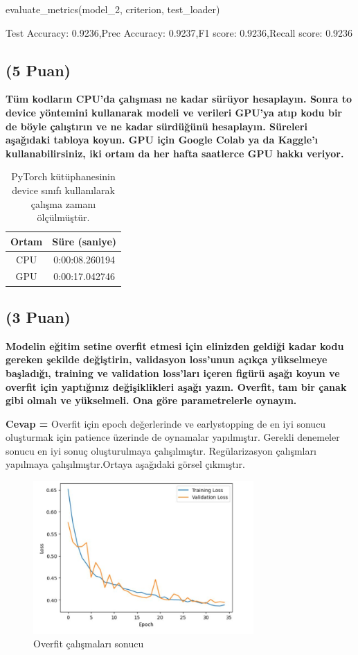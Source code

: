 \documentclass[11pt]{article}
\begin{document}
\begin{python}
evaluate_metrics(model_2, criterion, test_loader)
\end{python}

 Test Accuracy: 0.9236,Prec Accuracy: 0.9237,F1 score: 0.9236,Recall score: 0.9236

\subsection{(5 Puan)} \textbf{Tüm kodların CPU'da çalışması ne kadar sürüyor hesaplayın. Sonra to device yöntemini kullanarak modeli ve verileri GPU'ya atıp kodu bir de böyle çalıştırın ve ne kadar sürdüğünü hesaplayın. Süreleri aşağıdaki tabloya koyun. GPU için Google Colab ya da Kaggle'ı kullanabilirsiniz, iki ortam da her hafta saatlerce GPU hakkı veriyor.}

\begin{table}[ht!]
    \centering
    \caption{PyTorch kütüphanesinin device sınıfı kullanılarak çalışma zamanı ölçülmüştür. }
    \begin{tabular}{c|c}
        Ortam & Süre (saniye) \\\hline
        CPU & 0:00:08.260194  \\
        GPU & 0:00:17.042746\\
    \end{tabular}
    \label{tab:my_table}
\end{table}


\subsection{(3 Puan)} \textbf{Modelin eğitim setine overfit etmesi için elinizden geldiği kadar kodu gereken şekilde değiştirin, validasyon loss'unun açıkça yükselmeye başladığı, training ve validation loss'ları içeren figürü aşağı koyun ve overfit için yaptığınız değişiklikleri aşağı yazın. Overfit, tam bir çanak gibi olmalı ve yükselmeli. Ona göre parametrelerle oynayın.}

 \textbf{Cevap = } Overfit için epoch değerlerinde ve earlystopping de en iyi sonucu oluşturmak için patience üzerinde de oynamalar yapılmıştır. Gerekli denemeler sonucu en iyi sonuç oluşturulmaya çalışılmıştır. Regülarizasyon çalışmları yapılmaya çalışılmıştır.Ortaya aşağıdaki görsel çıkmıştır.

\begin{figure}[ht!]
    \centering
    \includegraphics[width=0.75\textwidth]{alinti.JPG}
    \caption{Overfit çalışmaları sonucu}
    \label{fig:my_pic}
\end{figure}
\end{document}
